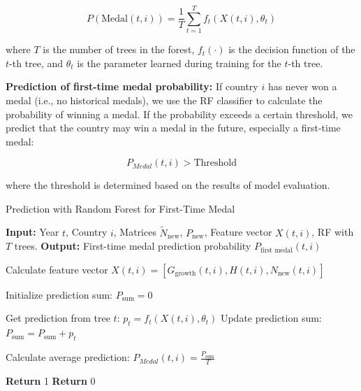 \documentclass{mcmthesis}
\begin{document}
\[
P(\text{Medal}(t,i)) = \frac{1}{T} \sum_{t=1}^{T} f_t(X(t,i), \theta_t)
\]

where \( T \) is the number of trees in the forest, \( f_t(\cdot) \) is the decision function of the \( t \)-th tree, and \( \theta_t \) is the parameter learned during training for the \( t \)-th tree.

\textbf{Prediction of first-time medal probability:}  
If country \( i \) has never won a medal (i.e., no historical medals), we use the RF classifier to calculate the probability of winning a medal. If the probability exceeds a certain threshold, we predict that the country may win a medal in the future, especially a first-time medal:

\[
P_{Medal}(t,i) > \text{Threshold}
\]

where the threshold is determined based on the results of model evaluation.
\begin{algorithm}
	\caption{Prediction with Random Forest for First-Time Medal}
	\begin{algorithmic}[1]
		\State \textbf{Input:} Year \( t \), Country \( i \), Matrices \( \tilde{N}_{\text{new}} \), \( P_{\text{new}} \), Feature vector \( X(t,i) \), RF with \( T \) trees.
		\State \textbf{Output:} First-time medal prediction probability \( P_{\text{first medal}}(t,i) \)
		
		\State Calculate feature vector \( X(t,i) = [G_{\text{growth}}(t,i), H(t,i), N_{\text{new}}(t,i)] \)
		
		\State Initialize prediction sum: \( P_{\text{sum}} = 0 \)
		
		\State Get prediction from tree \( t \): \( p_t = f_t(X(t,i), \theta_t) \)
		\State Update prediction sum: \( P_{\text{sum}} = P_{\text{sum}} + p_t \)
		\EndFor
		
		\State Calculate average prediction: \( P_{Medal}(t,i)  = \frac{P_{\text{sum}}}{T} \)
		
		\State \textbf{Return} 1 
		\Else
		\State \textbf{Return} 0 
		\EndIf
	\end{algorithmic}
\end{algorithm}

	
	
	
	
	
	
	
	
	
	
\end{document}
